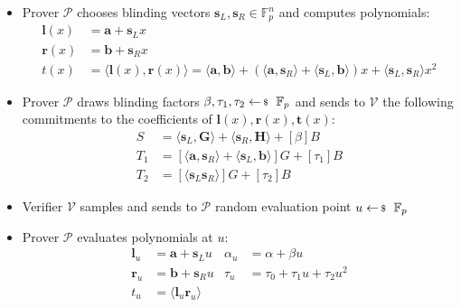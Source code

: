 \documentclass[../lecture-notes-148x210.tex]{subfiles}
\begin{document}
\begin{definition}
    \begin{itemize}
        \item Prover $\mathcal{P}$ chooses blinding vectors $\mathbf{s}_L, \mathbf{s}_R \in \mathbb{F}_p^n$ and computes polynomials:
            \begin{align*}
                \mathbf{l}(x) &= \mathbf{a} + \mathbf{s}_L x \\
                \mathbf{r}(x) &= \mathbf{b} + \mathbf{s}_R x \\
                t(x) &= \langle \mathbf{l}(x), \mathbf{r}(x) \rangle = \langle \mathbf{a}, \mathbf{b} \rangle + (\langle \mathbf{a}, \mathbf{s}_R \rangle + \langle \mathbf{s}_L, \mathbf{b} \rangle) x + \langle \mathbf{s}_L, \mathbf{s}_R \rangle x^2
            \end{align*}
        \item Prover $\mathcal{P}$ draws blinding factors $\beta, \tau_1, \tau_2 \leftarrowS \mathbb{F}_p$ and sends to $\mathcal{V}$ the following commitments to the coefficients of $\mathbf{l}(x), \mathbf{r}(x), \mathbf{t}(x)$:
            \begin{equation}
                \begin{aligned}
                    S &= \langle \mathbf{s}_L, \mathbf{G} \rangle + \langle \mathbf{s}_R, \mathbf{H} \rangle + [\beta]B\\
                    T_1 &= [\langle \mathbf{a}, \mathbf{s}_R \rangle + \langle \mathbf{s}_L, \mathbf{b} \rangle]G + [\tau_1]B \\
                    T_2 &= [\langle \mathbf{s}_L \mathbf{s}_R \rangle]G + [\tau_2]B
                \end{aligned}
            \end{equation}
        \item Verifier $\mathcal{V}$ samples and sends to $\mathcal{P}$ random evaluation point $u \leftarrowS \mathbb{F}_p$
        \item Prover $\mathcal{P}$ evaluates polynomials at $u$:
            \begin{equation}
                \begin{aligned}
                    \mathbf{l}_u & = \mathbf{a} + \mathbf{s}_L u & \alpha_u &= \alpha + \beta u\\
                    \mathbf{r}_u &= \mathbf{b} + \mathbf{s}_R u & \tau_u &= \tau_0 + \tau_1 u + \tau_2 u^2\\
                    t_u &= \langle \mathbf{l}_u \mathbf{r}_u \rangle & 
                \end{aligned}

\end{equation}
\end{itemize}
\end{definition}
\end{document}
